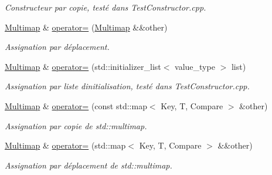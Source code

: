 \begin{DoxyCompactItemize}
\begin{DoxyCompactList}\small\item\em Constructeur par copie, testé dans Test\+Constructor.\+cpp. \end{DoxyCompactList}\item 
\mbox{\label{classMultimap_a313be5fe73cd69bbcf2b2c029d8fbc4a}} 
\hyperlink{classMultimap}{Multimap} \& \hyperlink{classMultimap_a313be5fe73cd69bbcf2b2c029d8fbc4a}{operator=} (\hyperlink{classMultimap}{Multimap} \&\&other)
\begin{DoxyCompactList}\small\item\em Assignation par déplacement. \end{DoxyCompactList}\item 
\mbox{\label{classMultimap_af4b74462f9b465dc21807083367f623b}} 
\hyperlink{classMultimap}{Multimap} \& \hyperlink{classMultimap_af4b74462f9b465dc21807083367f623b}{operator=} (std\+::initializer\+\_\+list$<$ value\+\_\+type $>$ list)
\begin{DoxyCompactList}\small\item\em Assignation par liste d\textquotesingle{}initialisation, testé dans Test\+Constructor.\+cpp. \end{DoxyCompactList}\item 
\mbox{\label{classMultimap_a1f0ece045c7938df1f583eb76928b32a}} 
\hyperlink{classMultimap}{Multimap} \& \hyperlink{classMultimap_a1f0ece045c7938df1f583eb76928b32a}{operator=} (const std\+::map$<$ Key, T, Compare $>$ \&other)
\begin{DoxyCompactList}\small\item\em Assignation par copie de std\+::multimap. \end{DoxyCompactList}\item 
\mbox{\label{classMultimap_a339929d8a0ef5a1a2ec4f082e2e456b6}} 
\hyperlink{classMultimap}{Multimap} \& \hyperlink{classMultimap_a339929d8a0ef5a1a2ec4f082e2e456b6}{operator=} (std\+::map$<$ Key, T, Compare $>$ \&\&other)
\begin{DoxyCompactList}\small\item\em Assignation par déplacement de std\+::multimap. \end{DoxyCompactList}\item 
\mbox{\label{classMultimap_a9c10ccfcca7dd81119454f0f1f9e7b06}} 

\end{DoxyCompactItemize}
